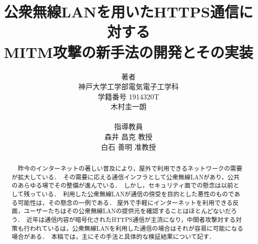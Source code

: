 \documentclass[dvipdfmx]{jsarticle}
\title{公衆無線LANを用いたHTTPS通信に対する\\MITM攻撃の新手法の開発とその実装}
\author{
    著者\\
    神戸大学工学部電気電子工学科\\
    学籍番号 1914320T\\
    木村圭一朗\\
    \\
    指導教員\\
    森井 昌克 教授\\
    白石 善明 准教授\\
}
\begin{document}
    \maketitle
    \begin{abstract}
        　昨今のインターネットの著しい普及により，屋外で利用できるネットワークの需要が拡大している．\
        その需要に応える通信インフラとして公衆無線LANがあり，公共のあらゆる場でその整備が進んでいる．\
        しかし，セキュリティ面での懸念は以前として残っている．\
        利用した公衆無線LANが通信の傍受を目的とした悪性のものである可能性は，その懸念の一例である．
        屋外で手軽にインターネットを利用できる反面，ユーザーたちはその公衆無線LANの提供元を確認することはほとんどないだろう．\
        近年は通信内容が暗号化されたHTTPS通信が主流になり，中間者攻撃対する対策も行われているは，公衆無線LANを利用した通信の場合はそれが容易に可能になる場合がある．\
        本稿では，主にその手法と具体的な検証結果について記す．
        \newline
    \end{abstract}
    \tableofcontents
    \clearpage
\end{document}
